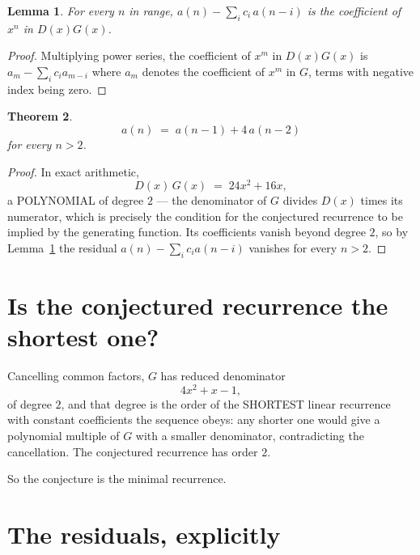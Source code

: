 \documentclass[11pt,a4paper]{article}
\theoremstyle{plain}
\newtheorem{theorem}{Theorem}
\newtheorem{lemma}[theorem]{Lemma}
\theoremstyle{definition}
\begin{document}
\begin{lemma}\label{lem:key}
For every $n$ in range, $a(n)-\sum_i c_i\,a(n-i)$ is the coefficient of $x^{n}$ in
$D(x)G(x)$.
\end{lemma}

\begin{proof}
Multiplying power series, the coefficient of $x^{m}$ in $D(x)G(x)$ is
$a_m-\sum_i c_i a_{m-i}$ where $a_m$ denotes the coefficient of $x^{m}$ in $G$, terms with
negative index being zero.
\end{proof}

\begin{theorem}
\[
a(n)\;=\;a(n-1) + 4\,a(n-2)
\]
for every $n>2$.
\end{theorem}

\begin{proof}
In exact arithmetic,
\[
D(x)\,G(x)\;=\;24 x^{2} + 16 x,
\]
a POLYNOMIAL of degree $2$ --- the denominator of $G$ divides $D(x)$ times its numerator,
which is precisely the condition for the conjectured recurrence to be implied by the
generating function. Its coefficients vanish beyond degree $2$, so by
Lemma~\ref{lem:key} the residual $a(n)-\sum_ic_ia(n-i)$ vanishes for every
$n>2$.
\end{proof}

\section{Is the conjectured recurrence the shortest one?}

Cancelling common factors, $G$ has reduced denominator
\[
4 x^{2} + x - 1,
\]
of degree $2$, and that degree is the order of the SHORTEST linear recurrence with
constant coefficients the sequence obeys: any shorter one would give a polynomial multiple of
$G$ with a smaller denominator, contradicting the cancellation. The conjectured recurrence has
order $2$.

So the conjecture is the minimal recurrence.

\section{The residuals, explicitly}
\end{document}
